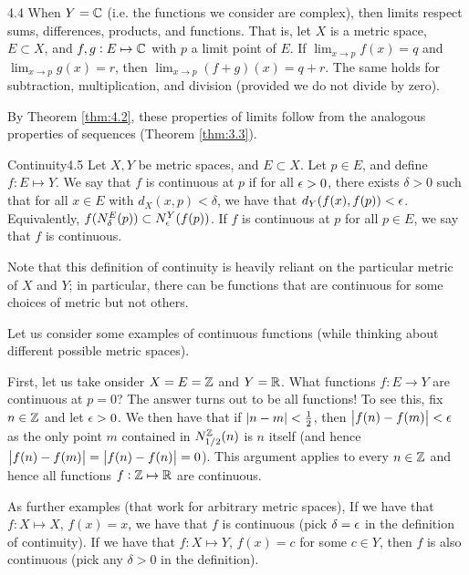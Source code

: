 
\begin{theorem}{}{4.4}
    When $Y = \mathbb{C}$ (i.e. the functions we consider are complex), then limits respect sums, differences, products, and functions. That is, let $X$ is a metric space, $E \subset X$, and $f, g: E \mapsto \mathbb{C}$ with $p$ a limit point of $E$. If $\lim_{x \rightarrow p}f(x) = q$ and $\lim_{x \rightarrow p}g(x) = r$, then $\lim_{x \rightarrow p}(f+g)(x) = q + r$. The same holds for subtraction, multiplication, and division (provided we do not divide by zero).
\end{theorem}
\begin{nproof}
    By Theorem \ref{thm:4.2}, these properties of limits follow from the analogous properties of sequences (Theorem \ref{thm:3.3}).
\end{nproof}

\begin{definition}{Continuity}{4.5}
    Let $X, Y$ be metric spaces, and $E \subset X$. Let $p \in E$, and define $f: E \mapsto Y$. We say that $f$ is continuous at $p$ if for all $\epsilon > 0$, there exists $\delta > 0$ such that for all $x \in E$ with $d_X(x, p) < \delta$, we have that $d_Y(f(x), f(p)) < \epsilon$. Equivalently, $f(N_\delta^E(p)) \subset N_\epsilon^Y(f(p))$. If $f$ is continuous at $p$ for all $p \in E$, we say that $f$ is continuous.
\end{definition}
\noindent Note that this definition of continuity is heavily reliant on the particular metric of $X$ and $Y$; in particular, there can be functions that are continuous for some choices of metric but not others.

Let us consider some examples of continuous functions (while thinking about different possible metric spaces). 

First, let us take onsider $X = E = \mathbb{Z}$ and $Y = \mathbb{R}$. What functions $f: E \rightarrow Y$ are continuous at $p = 0$? The answer turns out to be all functions! To see this, fix $n \in \mathbb{Z}$ and let $\epsilon > 0$. We then have that if $\abs{n - m} < \frac{1}{2}$, then $\abs{f(n) - f(m)} < \epsilon$ as the only point $m$ contained in $N_{1/2}^{\mathbb{Z}}(n)$ is $n$ itself (and hence $\abs{f(n) - f(m)} = \abs{f(n) - f(n)} = 0$). This argument applies to every $n \in \mathbb{Z}$ and hence all functions $f: \mathbb{Z} \mapsto \mathbb{R}$ are continuous.

As further examples (that work for arbitrary metric spaces), If we have that $f: X \mapsto X$, $f(x) = x$, we have that $f$ is continuous (pick $\delta = \epsilon$ in the definition of continuity). If we have that $f: X \mapsto Y$, $f(x) = c$ for some $c \in Y$, then $f$ is also continuous (pick any $\delta > 0$ in the definition). 
 
